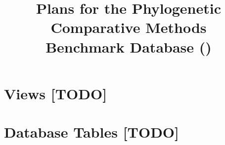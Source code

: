 \documentclass{article}
\title{Plans for the Phylogenetic Comparative Methods \\ Benchmark Database (\phycomb)}
\author{}
\begin{document}
\maketitle
\tableofcontents





\section{Views [TODO]}
\section{Database Tables [TODO]}

\end{document}
